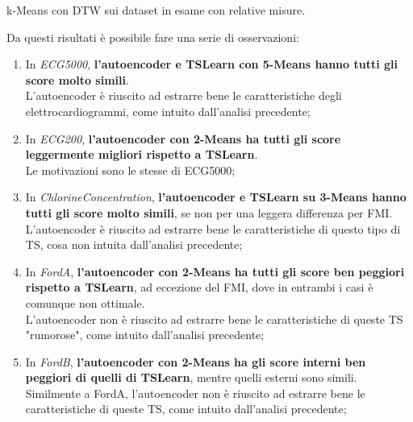 \begin{center}
	\begin{table}[H]
		\centering
		\caption{k-Means con DTW sui dataset in esame con relative misure.}
	\end{table}
\end{center}

Da questi risultati è possibile fare una serie di osservazioni:
\begin{enumerate}
	\item In \textit{ECG5000}, \textbf{l'autoencoder e TSLearn con 5-Means hanno tutti gli score molto simili}.\\
	L'autoencoder è riuscito ad estrarre bene le caratteristiche degli elettrocardiogrammi, come intuito dall'analisi precedente;

	\item In \textit{ECG200}, \textbf{l'autoencoder con 2-Means ha tutti gli score leggermente migliori rispetto a TSLearn}.\\
	Le motivazioni sono le stesse di ECG5000;

	\item In \textit{ChlorineConcentration}, \textbf{l'autoencoder e TSLearn su 3-Means hanno tutti gli score molto simili}, se non per una leggera differenza per FMI.\\
	L'autoencoder è riuscito ad estrarre bene le caratteristiche di questo tipo di TS, cosa non intuita dall'analisi precedente;

	\item In \textit{FordA}, \textbf{l'autoencoder con 2-Means ha tutti gli score ben peggiori rispetto a TSLearn}, ad eccezione del FMI, dove in entrambi i casi è comunque non ottimale.\\ L'autoencoder non è riuscito ad estrarre bene le caratteristiche di queste TS "rumorose", come intuito dall'analisi precedente;

	\item In \textit{FordB}, \textbf{l'autoencoder con 2-Means ha gli score interni ben peggiori di quelli di TSLearn}, mentre quelli esterni sono simili.\\
	Similmente a FordA, l'autoencoder non è riuscito ad estrarre bene le caratteristiche di queste TS, come intuito dall'analisi precedente;


\end{enumerate}

